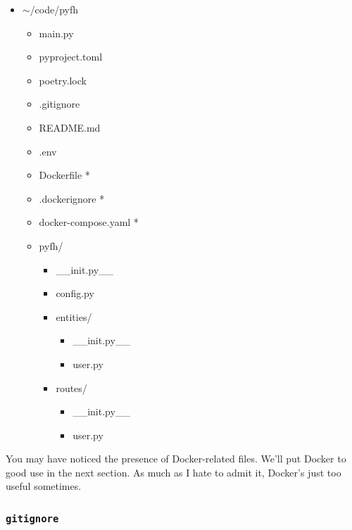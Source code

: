\documentclass[14pt]{extarticle}
\begin{document}
{\ttfamily
\begin{itemize}
    \item{$\sim$/code/pyfh}
        \begin{itemize}
            \item{main.py}
            \item{pyproject.toml}
            \item{poetry.lock}
            \item{.gitignore}
            \item{README.md}
            \item{.env}
            \item{Dockerfile *}
            \item{.dockerignore *}
            \item{docker-compose.yaml *}
            \item{pyfh/}
                \begin{itemize}
                    \item{\_\_init.py\_\_}
                    \item{config.py}
                    \item{entities/}
                        \begin{itemize}
                            \item{\_\_init.py\_\_}
                            \item{user.py}
                        \end{itemize}
                    \item{routes/}
                        \begin{itemize}
                            \item{\_\_init.py\_\_}
                            \item{user.py}
                        \end{itemize}
                \end{itemize}
        \end{itemize}
\end{itemize}
}

You may have noticed the presence of Docker-related files. We'll put Docker to good use in the next section. As much as I hate to admit it, Docker's just too useful sometimes.

\subsubsection{\texttt{gitignore}}
\end{document}
